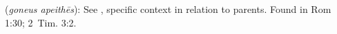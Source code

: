 \item[Disobedient to parents,]

(\textit{goneus apeithēs}):
See , specific context in relation to parents.
Found in Rom 1:30; 2~Tim. 3:2.
